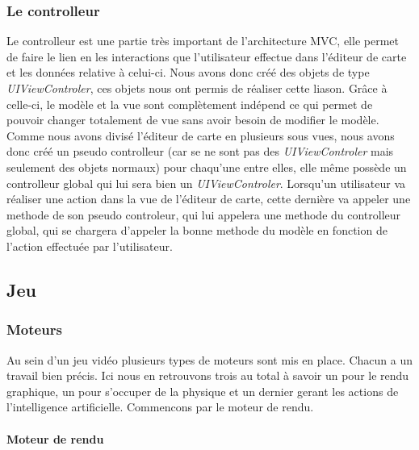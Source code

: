 			
	\subsubsection{Le controlleur}
		
		Le controlleur est une partie très important de l'architecture MVC, elle permet de faire le lien en les interactions que l'utilisateur effectue dans l'éditeur de carte et les données relative à celui-ci. Nous avons  donc créé des objets de type \textit{UIViewControler}, ces objets nous ont permis de réaliser cette liason. Grâce à celle-ci, le modèle et la vue sont complètement indépend ce qui permet de pouvoir changer totalement de vue sans avoir besoin de modifier le modèle. Comme nous avons divisé l'éditeur de carte en plusieurs sous vues, nous avons donc créé un \og pseudo \fg controlleur (car se ne sont pas des \textit{UIViewControler} mais seulement des objets normaux) pour chaqu'une entre elles, elle même possède un controlleur global qui lui sera bien un \textit{UIViewControler}. Lorsqu'un utilisateur va réaliser une action dans la vue de l'éditeur de carte, cette dernière va appeler une methode de son pseudo controleur, qui lui appelera une methode du controlleur global, qui se chargera d'appeler la bonne methode du modèle en fonction de l'action effectuée par l'utilisateur. 



\subsection{Jeu}

	\subsubsection{Moteurs}
	
		Au sein d'un jeu vidéo plusieurs types de moteurs sont mis en place.
		Chacun a un travail bien précis.
		Ici nous en retrouvons trois au total à savoir un pour le rendu graphique, un
		pour s'occuper de la physique et un dernier gerant les actions de
		l'intelligence artificielle.
		Commencons par le moteur de rendu.
	
		\paragraph{Moteur de rendu\\}
		
			\hypertarget{Moteur de rendu}{}
			\label{Moteur de rendu}
		

